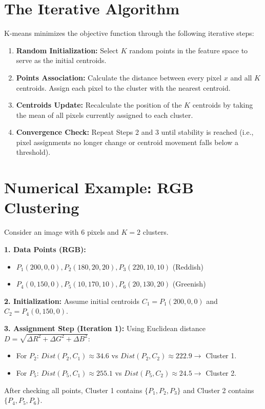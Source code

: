 \documentclass{report}
\begin{document}
\section{The Iterative Algorithm}
K-means minimizes the objective function through the following iterative steps:
\begin{enumerate}
    \item \textbf{Random Initialization:} Select $K$ random points in the feature space to serve as the initial centroids.
    \item \textbf{Points Association:} Calculate the distance between every pixel $x$ and all $K$ centroids. Assign each pixel to the cluster with the nearest centroid.
    \item \textbf{Centroids Update:} Recalculate the position of the $K$ centroids by taking the mean of all pixels currently assigned to each cluster.
    \item \textbf{Convergence Check:} Repeat Steps 2 and 3 until stability is reached (i.e., pixel assignments no longer change or centroid movement falls below a threshold).
\end{enumerate}

\section{Numerical Example: RGB Clustering}
Consider an image with 6 pixels and $K=2$ clusters.

\textbf{1. Data Points (RGB):}
\begin{itemize}
    \item $P_1(200, 0, 0), P_2(180, 20, 20), P_3(220, 10, 10)$ (Reddish)
    \item $P_4(0, 150, 0), P_5(10, 170, 10), P_6(20, 130, 20)$ (Greenish)
\end{itemize}

\textbf{2. Initialization:}
Assume initial centroids $C_1 = P_1(200, 0, 0)$ and $C_2 = P_4(0, 150, 0)$.

\textbf{3. Assignment Step (Iteration 1):}
Using Euclidean distance $D = \sqrt{\Delta R^2 + \Delta G^2 + \Delta B^2}$:
\begin{itemize}
    \item For $P_2$: $Dist(P_2, C_1) \approx 34.6$ vs $Dist(P_2, C_2) \approx 222.9 \rightarrow$ Cluster 1.
    \item For $P_5$: $Dist(P_5, C_1) \approx 255.1$ vs $Dist(P_5, C_2) \approx 24.5 \rightarrow$ Cluster 2.
\end{itemize}
After checking all points, Cluster 1 contains $\{P_1, P_2, P_3\}$ and Cluster 2 contains $\{P_4, P_5, P_6\}$.
\end{document}
